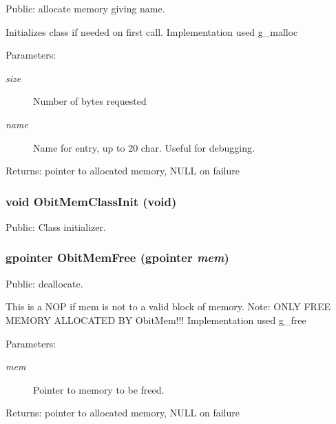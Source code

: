Public: allocate memory giving name. 

Initializes class if needed on first call. Implementation used g\_\-malloc \begin{Desc}
\item[Parameters:]
\begin{description}
\item[{\em size}]Number of bytes requested \item[{\em name}]Name for entry, up to 20 char. Useful for debugging. \end{description}
\end{Desc}
\begin{Desc}
\item[Returns:]pointer to allocated memory, NULL on failure \end{Desc}
\subsubsection{\setlength{\rightskip}{0pt plus 5cm}void Obit\-Mem\-Class\-Init (void)}\label{ObitMem_8c_a19}


Public: Class initializer. 

\subsubsection{\setlength{\rightskip}{0pt plus 5cm}gpointer Obit\-Mem\-Free (gpointer {\em mem})}\label{ObitMem_8c_a15}


Public: deallocate. 

This is a NOP if mem is not to a valid block of memory. Note: ONLY FREE MEMORY ALLOCATED BY Obit\-Mem!!! Implementation used g\_\-free \begin{Desc}
\item[Parameters:]
\begin{description}
\item[{\em mem}]Pointer to memory to be freed. \end{description}
\end{Desc}
\begin{Desc}
\item[Returns:]pointer to allocated memory, NULL on failure \end{Desc}
